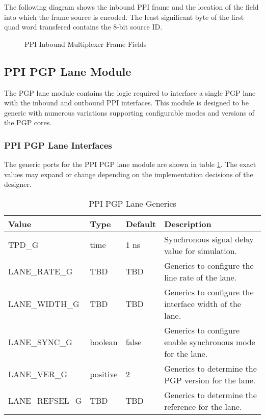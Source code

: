 \documentclass[11pt]{article}
\begin{document}
The following diagram shows the inbound PPI frame and the location of the field into which the frame source is encoded.
The least significant byte of the first quad word transfered contains the 8-bit source ID. 

\begin{figure}[H]
   \centering
   \caption{PPI Inbound Multiplexer Frame Fields}
   \label{fig:ppi_ib_frame_fields}
\end{figure}

\subsection{PPI PGP Lane Module}
\label{subsec:ppi_pgp_lane}

The PGP lane module contains the logic required to interface a single PGP lane with the inbound and outbound PPI interfaces.
This module is designed to be generic with numerous variations supporting configurable modes and versions of the PGP cores.

\subsubsection{PPI PGP Lane Interfaces}

The generic ports for the PPI PGP lane module are shown in table \ref{tab:ppi_pgp_lane_generics}. 
The exact values may expand or change depending on the implementation decisions  of the designer. 

\begin{table}[H]
\small
\centering
   \begin{tabular}{| l | l | l | l | }
      \hline \textbf{Value} & \textbf{Type} & \textbf{Default} & \textbf{Description} \\
      \hline TPD\_G                  & time    & 1 ns  & Synchronous signal delay value for simulation.       \\
      \hline LANE\_RATE\_G    & TBD      & TBD   & Generics to configure the line rate of the lane. \\
      \hline LANE\_WIDTH\_G   & TBD      & TBD   & Generics to configure the interface width of the lane. \\
      \hline LANE\_SYNC\_G    & boolean  & false & Generics to configure enable synchronous mode for the lane. \\
      \hline LANE\_VER\_G     & positive & 2     & Generics to determine the PGP version for the lane. \\
      \hline LANE\_REFSEL\_G  & TBD      & TBD   & Generics to determine the reference for the lane. \\
      \hline
   \end{tabular}
   \caption{PPI PGP Lane Generics}
   \label{tab:ppi_pgp_lane_generics}
\end{table}
\end{document}
